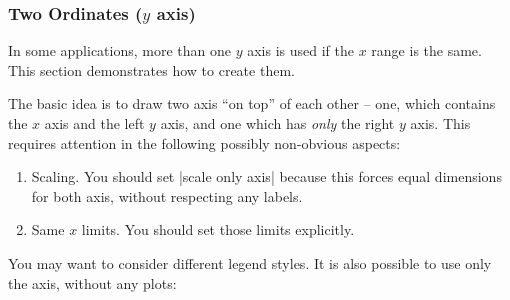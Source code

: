 \subsubsection[Two Ordinates]{Two Ordinates ($y$ axis)}
{%
%
In some applications, more than one $y$ axis is used if the $x$ range is the same. This section demonstrates how to create them.

\begin{codeexample}[]
\end{codeexample}
\noindent The basic idea is to draw two axis ``on top'' of each other -- one, which contains the $x$ axis and the left $y$ axis, and one which has \emph{only} the right $y$ axis. This requires attention in the following possibly non-obvious aspects:
\begin{enumerate}
	\item Scaling. You should set |scale only axis| because this forces equal dimensions for both axis, without respecting any labels.
	\item Same $x$ limits. You should set those limits explicitly.
\end{enumerate}
You may want to consider different legend styles.
It is also possible to use only the axis, without any plots:
\begin{codeexample}[]
\end{codeexample}
}

